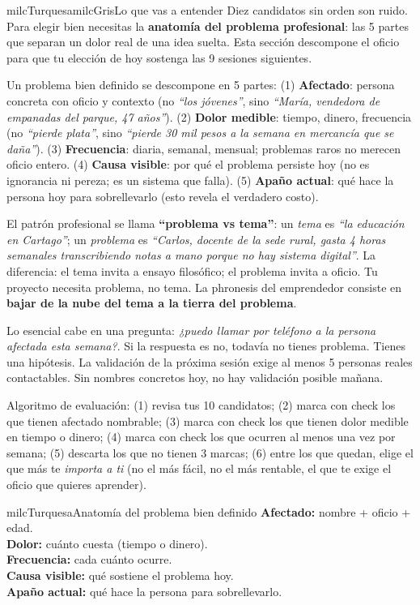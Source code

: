 \documentclass[11pt,letterpaper]{article}
\newcommand{\milcpaso}[3]{%
\Needspace{4\baselineskip}%
\begin{tcolorbox}[enhanced,colback=white,colframe=milcLinea,arc=1.5mm,boxrule=.9pt,
  left=14mm,right=4mm,top=3mm,bottom=3mm,before skip=4pt,after skip=4pt,
  fontupper=\RaggedRight,
  overlay={\node[anchor=north west,circle,fill=#2,text=white,inner sep=0pt,
    minimum size=7.4mm,font=\sffamily\bfseries\small]
    at ([xshift=3.6mm,yshift=-3.2mm]frame.north west) {#1};}]
#3
\end{tcolorbox}}
\begin{document}
\begin{softbox}{milcTurquesa}{milcGris}{Lo que vas a entender}
Diez candidatos sin orden son ruido. Para elegir bien necesitas la \textbf{anatomía del problema profesional}: las 5 partes que separan un dolor real de una idea suelta. Esta sección descompone el oficio para que tu elección de hoy sostenga las 9 sesiones siguientes.
\end{softbox}

\milcpaso{1}{milcTurquesa}{Un problema bien definido se descompone en 5 partes: (1) \textbf{Afectado}: persona concreta con oficio y contexto (no \emph{``los jóvenes''}, sino \emph{``María, vendedora de empanadas del parque, 47 años''}). (2) \textbf{Dolor medible}: tiempo, dinero, frecuencia (no \emph{``pierde plata''}, sino \emph{``pierde 30 mil pesos a la semana en mercancía que se daña''}). (3) \textbf{Frecuencia}: diaria, semanal, mensual; problemas raros no merecen oficio entero. (4) \textbf{Causa visible}: por qué el problema persiste hoy (no es ignorancia ni pereza; es un sistema que falla). (5) \textbf{Apaño actual}: qué hace la persona hoy para sobrellevarlo (esto revela el verdadero costo).}
\milcpaso{2}{milcTurquesa}{El patrón profesional se llama \textbf{``problema vs tema''}: un \emph{tema} es \emph{``la educación en Cartago''}; un \emph{problema} es \emph{``Carlos, docente de la sede rural, gasta 4 horas semanales transcribiendo notas a mano porque no hay sistema digital''}. La diferencia: el tema invita a ensayo filosófico; el problema invita a oficio. Tu proyecto necesita problema, no tema. La phronesis del emprendedor consiste en \textbf{bajar de la nube del tema a la tierra del problema}.}
\milcpaso{3}{milcTurquesa}{Lo esencial cabe en una pregunta: \emph{¿puedo llamar por teléfono a la persona afectada esta semana?}. Si la respuesta es no, todavía no tienes problema. Tienes una hipótesis. La validación de la próxima sesión exige al menos 5 personas reales contactables. Sin nombres concretos hoy, no hay validación posible mañana.}
\milcpaso{4}{milcTurquesa}{Algoritmo de evaluación: (1) revisa tus 10 candidatos; (2) marca con check los que tienen afectado nombrable; (3) marca con check los que tienen dolor medible en tiempo o dinero; (4) marca con check los que ocurren al menos una vez por semana; (5) descarta los que no tienen 3 marcas; (6) entre los que quedan, elige el que más te \emph{importa a ti} (no el más fácil, no el más rentable, el que te exige el oficio que quieres aprender).}

\begin{drawbox}{milcTurquesa}{Anatomía del problema bien definido}
\textbf{Afectado:} nombre + oficio + edad. \\[1mm] \textbf{Dolor:} cuánto cuesta (tiempo o dinero). \\[1mm] \textbf{Frecuencia:} cada cuánto ocurre. \\[1mm] \textbf{Causa visible:} qué sostiene el problema hoy. \\[1mm] \textbf{Apaño actual:} qué hace la persona para sobrellevarlo.
\end{drawbox}
\end{document}
